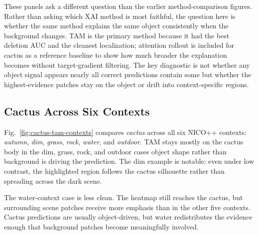 \documentclass[10pt]{article}
\begin{document}
These panels ask a different question than the earlier method-comparison figures. Rather than asking which XAI method is most faithful, the question here is whether the same method explains the same object consistently when the background changes. TAM is the primary method because it had the best deletion AUC and the cleanest localization; attention rollout is included for cactus as a reference baseline to show how much broader the explanation becomes without target-gradient filtering. The key diagnostic is not whether any object signal appears nearly all correct predictions contain some but whether the highest-evidence patches stay on the object or drift into context-specific regions.

\subsection{Cactus Across Six Contexts}
Fig.~\ref{fig:cactus-tam-contexts} compares \emph{cactus} across all six NICO++ contexts: \emph{autumn}, \emph{dim}, \emph{grass}, \emph{rock}, \emph{water}, and \emph{outdoor}. TAM stays mostly on the cactus body in the dim, grass, rock, and outdoor cases object shape rather than background is driving the prediction. The dim example is notable: even under low contrast, the highlighted region follows the cactus silhouette rather than spreading across the dark scene.

The water-context case is less clean. The heatmap still reaches the cactus, but surrounding scene patches receive more emphasis than in the other five contexts. Cactus predictions are usually object-driven, but water redistributes the evidence enough that background patches become meaningfully involved.
\end{document}
